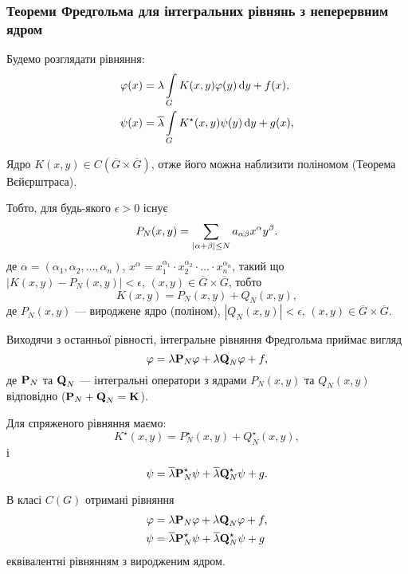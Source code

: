 \subsubsection{Теореми Фредгольма для інтегральних рівнянь з неперервним ядром}

Будемо розглядати рівняння:
\begin{align}
	\phi(x) &= \lambda \Int_G K(x, y) \phi(y) \diff y + f(x), \\
	\psi(x) &= \overline \lambda \Int_G K^\star (x, y) \psi(y) \diff y + g(x),
\end{align}

Ядро $K(x, y) \in C\left(\overline G \times \overline G\right)$, отже його можна наблизити поліномом (Теорема Вєйєрштраса). \medskip

Тобто, для будь-якого $\epsilon > 0$ існує 
\begin{equation}
	P_N(x, y) = \Sum_{|\alpha + \beta| \le N} a_{\alpha\beta}x^\alpha y^\beta.
\end{equation}
де $\alpha = (\alpha_1, \alpha_2, \ldots, \alpha_n)$, $x^\alpha = x_1^{\alpha_1} \cdot x_2^{\alpha_2} \cdot \ldots \cdot x_n^{\alpha_n}$, такий що $|K(x, y) - P_N(x, y)| < \epsilon$, $(x, y) \in \overline G \times \overline G$, тобто 
\begin{equation}
	K(x, y) = P_N(x, y) + Q_N(x, y),
\end{equation}
де $P_N(x,y)$ --- вироджене ядро (поліном), $|Q_N(x, y)| < \epsilon$, $(x, y) \in \overline G \times \overline G$. \medskip

Виходячи з останньої рівності, інтегральне рівняння Фредгольма приймає вигляд 
\begin{equation}
	\phi = \lambda \bf{P}_N \phi + \lambda \bf{Q}_N \phi + f,
\end{equation}
де $\bf{P}_N$ та $\bf{Q}_N$ --- інтегральні оператори з ядрами $P_N(x, y)$ та $Q_N(x, y)$ відповідно ($\bf{P}_N + \bf{Q}_N = \bf{K}$). \medskip

Для спряженого рівняння маємо:
\begin{equation}
	K^\star (x, y) = P_N^\star (x, y) + Q_N^\star (x, y),
\end{equation}
і
\begin{equation}
	\psi = \overline \lambda \bf{P}_N^\star  \psi + \overline \lambda \bf{Q}_N^\star  \psi + g.
\end{equation}

\begin{proposition}
	В класі $C(G)$ отримані рівняння
	\begin{align}
		\phi &= \lambda \bf{P}_N \phi + \lambda \bf{Q}_N \phi + f, \\
		\psi &= \overline \lambda \bf{P}_N^\star  \psi + \overline \lambda \bf{Q}_N^\star  \psi + g
	\end{align}
	еквівалентні рівнянням з виродженим ядром. 
\end{proposition}

